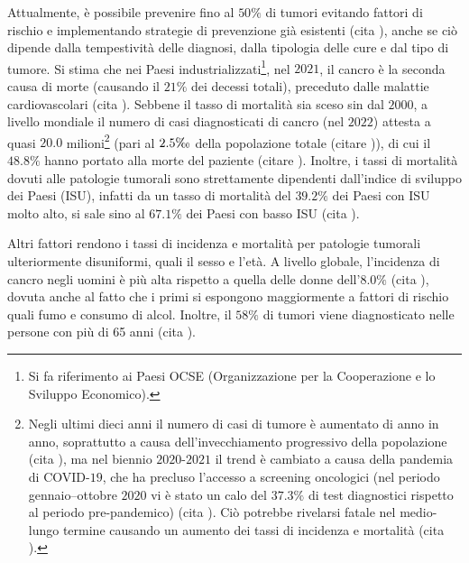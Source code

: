 \documentclass[12pt,a4paper,twoside]{report}
\begin{document}
	Attualmente, è possibile prevenire fino al $50\%$ di tumori evitando fattori di rischio e implementando strategie di prevenzione già esistenti (cita
	), anche se ciò dipende dalla tempestività delle diagnosi, dalla tipologia delle cure e dal tipo di tumore. Si stima che nei Paesi industrializzati\footnote{Si fa riferimento ai Paesi OCSE (Organizzazione per la Cooperazione e lo Sviluppo Economico).}, nel $2021$, il cancro è la seconda causa di morte (causando il $21\%$ dei decessi totali), preceduto dalle malattie cardiovascolari (cita %
	). Sebbene il tasso di mortalità sia sceso sin dal $2000$, a livello mondiale il numero di casi diagnosticati di cancro (nel $2022$) attesta a quasi $20.0$ milioni\footnote{Negli ultimi dieci anni il numero di casi di tumore è aumentato di anno in anno, soprattutto a causa dell'invecchiamento progressivo della popolazione (cita
	), ma nel biennio $2020$-$2021$ il trend è cambiato a causa della pandemia di COVID-$19$, che ha precluso l'accesso a screening oncologici (nel periodo gennaio--ottobre $2020$ vi è stato un calo del $37.3\%$ di test diagnostici rispetto al periodo pre-pandemico) (cita
	). Ciò potrebbe rivelarsi fatale nel medio-lungo termine causando un aumento dei tassi di incidenza e mortalità (cita
	).} (pari al $2.5\tcperthousand$ della popolazione totale (citare %
	)), di cui il $48.8\%$ hanno portato alla morte del paziente (citare
	). Inoltre, i tassi di mortalità dovuti alle patologie tumorali sono strettamente dipendenti dall'indice di sviluppo dei Paesi (ISU), infatti da un tasso di mortalità del $39.2\%$ dei Paesi con ISU molto alto, si sale sino al $67.1\%$ dei Paesi con basso ISU (cita
	).
	
	Altri fattori rendono i tassi di incidenza e mortalità per patologie tumorali ulteriormente disuniformi, quali il sesso e l'età. A livello globale, l'incidenza di cancro negli uomini è più alta rispetto a quella delle donne dell'$8.0\%$ (cita
	), dovuta anche al fatto che i primi si espongono maggiormente a fattori di rischio quali fumo e consumo di alcol. Inoltre, il $58\%$ di tumori viene diagnosticato nelle persone con più di 65 anni (cita
	).
	
\end{document}
